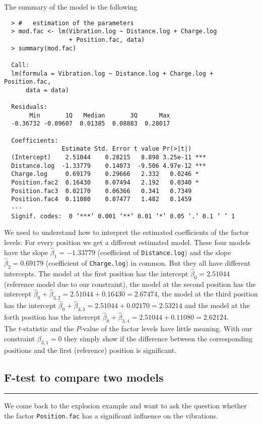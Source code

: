 The summary of the model is the following
\begingroup
\scriptsize
\begin{verbatim}
  > #   estimation of the parameters
  > mod.fac <- lm(Vibration.log ~ Distance.log + Charge.log
                  + Position.fac, data)
  > summary(mod.fac)

  Call:
  lm(formula = Vibration.log ~ Distance.log + Charge.log + Position.fac,
      data = data)

  Residuals:
       Min       1Q   Median       3Q      Max
  -0.36732 -0.09607  0.01385  0.08883  0.28017

  Coefficients:
                Estimate Std. Error t value Pr(>|t|)
  (Intercept)    2.51044    0.28215   8.898 3.25e-11 ***
  Distance.log  -1.33779    0.14073  -9.506 4.97e-12 ***
  Charge.log     0.69179    0.29666   2.332   0.0246 *
  Position.fac2  0.16430    0.07494   2.192   0.0340 *
  Position.fac3  0.02170    0.06366   0.341   0.7349
  Position.fac4  0.11080    0.07477   1.482   0.1459
  ---
  Signif. codes:  0 ‘***’ 0.001 ‘**’ 0.01 ‘*’ 0.05 ‘.’ 0.1 ‘ ’ 1

\end{verbatim}
\endgroup

We need to understand how to interpret the estimated coefficients of the factor levels:
For every position we get a different estimated model. These four models have the slope $\hat{\beta}_1 = -1.33779$ (coefficient of \texttt{Distance.log}) and the slope $\hat{\beta}_2 = 0.69179$ (coefficient of \texttt{Charge.log}) in common.
But they all have different intercepts. The model at the first position has the intercept $\hat{\beta}_0 = 2.51044$ (reference model due to our constraint), the model at the second position has the intercept $\hat{\beta}_0 + \hat{\beta}_{3,2} = 2.51044 + 0.16430 = 2.67474$, the model at the third position has the intercept $\hat{\beta}_0 + \hat{\beta}_{3,3} = 2.51044 + 0.02170 = 2.53214$ and the model at the forth position has the intercept $\hat{\beta}_0 + \hat{\beta}_{3,4} = 2.51044 + 0.11080 = 2.62124$.\\

The $t$-statistic and the $P$-value of the factor levels have little meaning. With our constraint $\beta_{3,1} = 0$ they simply show if the difference between the corresponding positions and the first (reference) position is significant.


\subsection{F-test to compare two models}
\noindent\rule[\linienAbstand]{\linewidth}{\linienDicke}
We come back to the explosion example and want to ask the question whether the factor \texttt{Position.fac} has a significant influence on the vibrations.\\

